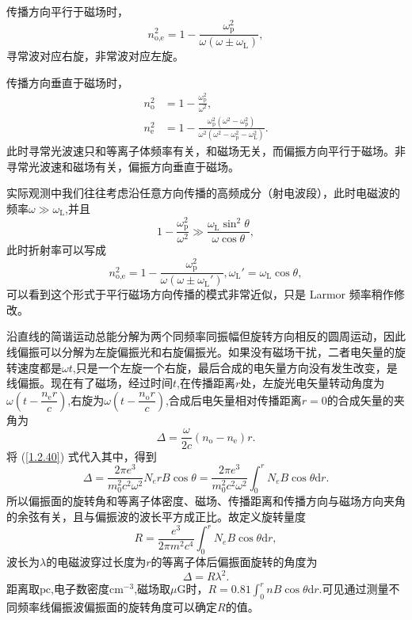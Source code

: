 \documentclass[../天体物理基础.tex]{subfiles}
\begin{document}
传播方向平行于磁场时，
\begin{equation}
n_{\text{o,e}}^{2}=1-\frac{\omega_{\text{p}}^{2}}{\omega\left(\omega\pm\omega_{\text{L}}\right)},
\end{equation}
寻常波对应右旋，非常波对应左旋。

传播方向垂直于磁场时，
\begin{align}
n_{\text{o}}^{2}&=1-\frac{\omega^{2}_{\text{p}}}{\omega^{2}},\\
n_{\text{e}}^{2}&=1-\frac{\omega_{\text{p}}^{2}\left(\omega^{2}-\omega_{\text{p}}^{2}\right)}{\omega^{2}\left(\omega^{2}-\omega_{\text{p}}^{2}-\omega_{\text{L}}^{2}\right)}.
\end{align}
此时寻常光波速只和等离子体频率有关，和磁场无关，而偏振方向平行于磁场。非寻常光波速和磁场有关，偏振方向垂直于磁场。

实际观测中我们往往考虑沿任意方向传播的高频成分（射电波段），此时电磁波的频率$\omega\gg\omega_{\text{L}}$,并且
\begin{equation}
1-\frac{\omega_{\text{p}}^{2}}{\omega^{2}}\gg\frac{\omega_{\text{L}}\sin^{2}\theta}{\omega\cos\theta},
\end{equation}
此时折射率可以写成
\begin{equation}
n^{2}_{\text{o,e}}=1-\frac{\omega_{\text{p}}^{2}}{\omega\left(\omega\pm\omega_{\text{L}}'\right)},\omega_{\text{L}}'=\omega_{\text{L}}\cos\theta,\label{1.2.40}
\end{equation}
可以看到这个形式于平行磁场方向传播的模式非常近似，只是 Larmor 频率稍作修改。

沿直线的简谐运动总能分解为两个同频率同振幅但旋转方向相反的圆周运动，因此线偏振可以分解为左旋偏振光和右旋偏振光。如果没有磁场干扰，二者电矢量的旋转速度都是$\omega t$,只是一个左旋一个右旋，最后合成的电矢量方向没有发生改变，是线偏振。现在有了磁场，经过时间$t$,在传播距离$r$处，左旋光电矢量转动角度为$\omega\left(t-\dfrac{n_{\text{e}}r}{c}\right)$,右旋为$\omega\left(t-\dfrac{n_{\text{o}}r}{c}\right)$,合成后电矢量相对传播距离$r=0$的合成矢量的夹角为
\begin{equation}
\Delta{}=\frac{\omega}{2c}\left(n_{\text{o}}-n_{\text{e}}\right)r.
\end{equation}
将 (\ref{1.2.40}) 式代入其中，得到
\begin{equation}
\Delta{}=\frac{2\pi e^{3}}{m_{0}^{2}c^{2}\omega^{2}}N_{e}rB\cos\theta=\frac{2\pi e^{3}}{m_{0}^{2}c^{2}\omega^{2}}\int_{0}^{r}N_{e}B\cos\theta\mathrm{d}r.
\end{equation}
所以偏振面的旋转角和等离子体密度、磁场、传播距离和传播方向与磁场方向夹角的余弦有关，且与偏振波的波长平方成正比。故定义旋转量度
\begin{equation}
R=\frac{e^{3}}{2\pi m^{2}c^{4}}\int_{0}^{r}N_{e}B\cos\theta\mathrm{d}r,
\end{equation}
波长为$\lambda$的电磁波穿过长度为$r$的等离子体后偏振面旋转的角度为
\begin{equation}
\Delta{}=R\lambda^{2}.
\end{equation}
距离取$\mathrm{pc}$,电子数密度$\mathrm{cm^{-3}}$,磁场取$\mu\mathrm{G}$时，$R=0.81\int_{0}^{r}nB\cos\theta\mathrm{d}r$.可见通过测量不同频率线偏振波偏振面的旋转角度可以确定$R$的值。
\end{document}
